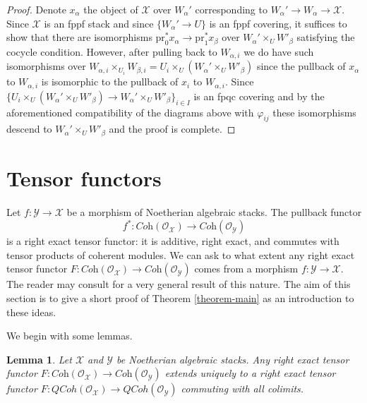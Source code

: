 \documentclass{stacks-project}
\theoremstyle{plain}
\newtheorem{lemma}[subsection]{Lemma}
\theoremstyle{definition}
\theoremstyle{remark}
\numberwithin{equation}{subsection}
\def\QCoh{\mathit{QCoh}}
\begin{document}
\begin{proof}
\medskip\noindent
Denote $x_\alpha$ the object of $\mathcal{X}$ over $W_\alpha'$
corresponding to $W_\alpha' \to W_\alpha \to \mathcal{X}$.
Since $\mathcal{X}$ is an fppf stack and since
$\{W_\alpha' \to U\}$ is an fppf covering, it suffices
to show that there are isomorphisms
$\text{pr}_0^*x_\alpha \to \text{pr}_1^*x_\beta$
over $W_\alpha' \times_U W'_\beta$ satisfying the
cocycle condition. However, after pulling back to
$W_{\alpha, i}$ we do have such isomorphisms over
$W_{\alpha, i} \times_{U_i} W_{\beta, i} =
U_i \times_U (W_\alpha' \times_U W'_\beta)$
since the pullback of $x_\alpha$ to $W_{\alpha, i}$
is isomorphic to the pullback of $x_i$ to $W_{\alpha, i}$.
Since $\{U_i \times_U (W_\alpha' \times_U W'_\beta) \to
W_\alpha' \times_U W'_\beta\}_{i \in I}$
is an fpqc covering and by the aforementioned compatibility
of the diagrams above with $\varphi_{ij}$ these
isomorphisms descend to $W_\alpha' \times_U W'_\beta$
and the proof is complete.
\end{proof}










\section{Tensor functors}
\label{section-tensor-functors}

\noindent
Let $f : \mathcal{Y} \to \mathcal{X}$ be a morphism of Noetherian
algebraic stacks. The pullback functor
$$
f^* :
\textit{Coh}(\mathcal{O}_\mathcal{X})
\longrightarrow
\textit{Coh}(\mathcal{O}_\mathcal{Y})
$$
is a right exact tensor functor: it is additive, right exact,
and commutes with tensor products of coherent modules. We can
ask to what extent any right exact tensor functor
$F : \textit{Coh}(\mathcal{O}_\mathcal{X}) \to
\textit{Coh}(\mathcal{O}_\mathcal{Y})$ comes from a
morphism $f : \mathcal{Y} \to \mathcal{X}$.
The reader may consult
\cite{Hall-Rydh-coherent} for a very general result
of this nature.
The aim of this section is to give a short proof of
Theorem \ref{theorem-main} as an introduction to these ideas.

\medskip\noindent
We begin with some lemmas.

\begin{lemma}
\label{lemma-extend}
Let $\mathcal{X}$ and $\mathcal{Y}$ be Noetherian algebraic stacks.
Any right exact tensor functor $F : \textit{Coh}(\mathcal{O}_\mathcal{X}) \to
\textit{Coh}(\mathcal{O}_\mathcal{Y})$ extends uniquely to a
right exact tensor functor
$F : \QCoh(\mathcal{O}_\mathcal{X}) \to \QCoh(\mathcal{O}_\mathcal{Y})$
commuting with all colimits.
\end{lemma}
\end{document}
